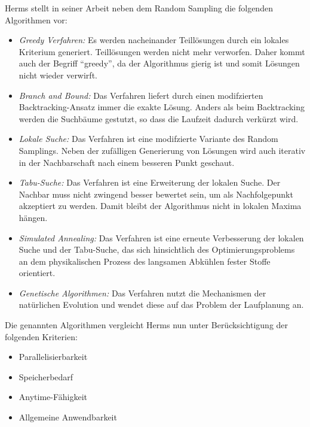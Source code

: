 Herms stellt in seiner Arbeit neben dem Random Sampling die folgenden Algorithmen vor:
\begin{itemize}
  \item \emph{Greedy Verfahren:} Es werden nacheinander Teillösungen durch ein lokales Kriterium generiert. Teillösungen werden nicht mehr verworfen. Daher kommt auch der Begriff "`greedy"', da der Algorithmus gierig ist und somit Lösungen nicht wieder verwirft.
  \item \emph{Branch and Bound:} Das Verfahren liefert durch einen modifzierten Backtracking-Ansatz immer die exakte Lösung. Anders als beim Backtracking werden die Suchbäume gestutzt, so dass die Laufzeit dadurch verkürzt wird.
  \item \emph{Lokale Suche:} Das Verfahren ist eine modifzierte Variante des Random Samplings. Neben der zufälligen Generierung von Lösungen wird auch iterativ in der Nachbarschaft nach einem besseren Punkt geschaut.
  \item \emph{Tabu-Suche:} Das Verfahren ist eine Erweiterung der lokalen Suche. Der Nachbar muss nicht zwingend besser bewertet sein, um als Nachfolgepunkt akzeptiert zu werden. Damit bleibt der Algorithmus nicht in lokalen Maxima hängen.
  \item \emph{Simulated Annealing:} Das Verfahren ist eine erneute Verbesserung der lokalen Suche und der Tabu-Suche, das sich hinsichtlich des Optimierungsproblems an dem physikalischen Prozess des langsamen Abkühlen fester Stoffe orientiert.
  \item \emph{Genetische Algorithmen:} Das Verfahren nutzt die Mechanismen der natürlichen Evolution und wendet diese auf das Problem der Laufplanung an.
\end{itemize}

Die genannten Algorithmen vergleicht Herms nun unter Berücksichtigung der folgenden Kriterien:
\begin{itemize}
  \item Parallelisierbarkeit
  \item Speicherbedarf
  \item Anytime-Fähigkeit
  \item Allgemeine Anwendbarkeit
\end{itemize}

